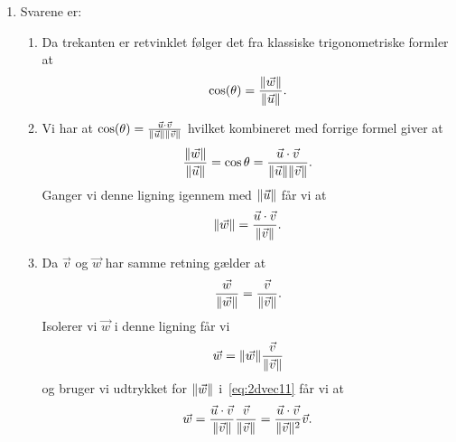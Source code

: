 \begin{enumerate}
	
%	
	
	\item\label{it:2dvec15ans}Svarene er:
	
	\begin{enumerate}
		\item Da trekanten er retvinklet følger det fra klassiske trigonometriske formler at
		\begin{align*}
		\cos(\theta)=\frac{\Vert \vec{w}\Vert}{\Vert \vec{u}\Vert}.
		\end{align*}
		
		\item Vi har at $\cos(\theta)=\frac{\vec{u}\cdot \vec{v}}{\Vert \vec{u}\Vert\Vert \vec{v}\Vert}$ hvilket kombineret med forrige formel giver at 
		\begin{align*}
		\frac{\Vert \vec{w}\Vert}{\Vert \vec{u}\Vert}=\cos \theta=\frac{\vec{u}\cdot \vec{v}}{\Vert \vec{u}\Vert\Vert \vec{v}\Vert}.
		\end{align*}
		Ganger vi denne ligning igennem med $\Vert \vec{u}\Vert$ får vi at		
		\begin{align}\label{eq:2dvec11ans}
		\Vert \vec{w}\Vert =\frac{\vec{u}\cdot \vec{v}}{\Vert \vec{v}\Vert}.
		\end{align}
		
		\item Da $\vec{v}$ og $\vec{w}$ har samme retning gælder at
		\begin{align*}
		\frac{\vec{w}}{\Vert \vec{w}\Vert}=\frac{\vec{v}}{\Vert \vec{v}\Vert}.
		\end{align*}
		Isolerer vi $\vec{w}$ i denne ligning får vi
		\begin{align*}
		\vec{w}=\Vert \vec{w}\Vert\frac{\vec{v}}{\Vert \vec{v}\Vert}
		\end{align*}
		og bruger vi udtrykket for $\Vert \vec{w}\Vert$ i~\eqref{eq:2dvec11} får vi at
		\begin{align*}
		\vec{w}=\frac{\vec{u}\cdot \vec{v}}{\Vert \vec{v}\Vert}\frac{\vec{v}}{\Vert \vec{v}\Vert}=\frac{\vec{u}\cdot \vec{v}}{\Vert \vec{v}\Vert^2}\vec{v}.
		\end{align*}
		

\end{enumerate}
\end{enumerate}
